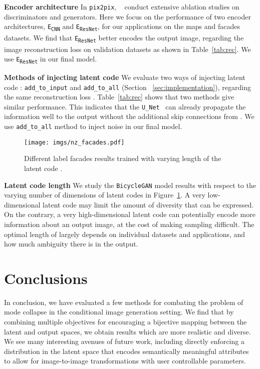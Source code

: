 \documentclass{article}
\newcommand{\pp}{\texttt{pix2pix}\xspace}
\newcommand{\bicycle}{\texttt{BicycleGAN}\xspace} \newcommand{\G}{G\xspace}
\begin{document}
{\bf Encoder architecture} In \pp, ~\citet{isola2016image} conduct extensive ablation studies on discriminators and generators. Here we focus on the performance of two encoder architectures, \texttt{E\textsubscript{CNN}} and \texttt{E\textsubscript{ResNet}}, for our applications on the maps and facades datasets. We find that \texttt{E\textsubscript{ResNet}} better encodes the output image, regarding the image reconstruction loss  on validation datasets as shown in Table~\ref{tab:rec}. We use \texttt{E\textsubscript{ResNet}} in our final model.

{\bf Methods of injecting latent code} We evaluate two ways of injecting latent code : \texttt{add\_to\_input} and \texttt{add\_to\_all} (Section ~\ref{sec:implementation}), regarding the same reconstruction loss . Table~\ref{tab:rec} shows that two methods give similar performance. This indicates that the \texttt{U\_Net}~\cite{ronneberger2015u} can already propagate the information well to the output without the additional skip connections from . We use \texttt{add\_to\_all} method to inject noise in our final model.

\begin{figure}
  \centering
  \texttt{[image: imgs/nz\_facades.pdf]}
\vspace{-4mm}
\caption{Different label  facades results trained with varying length of the latent code . }
\label{fig:numberofz}
\vspace{-6mm}
\end{figure}


{\bf Latent code length} We study the \bicycle model results with respect to the varying number of dimensions of latent codes  in Figure~\ref{fig:numberofz}. A very low-dimensional latent code may limit the amount of diversity that can be expressed. On the contrary, a very high-dimensional latent code can potentially encode more information about an output image, at the cost of making sampling difficult. The optimal length of  largely depends on individual datasets and applications, and how much ambiguity there is in the output. 

\vspace{-2mm} 
\section{Conclusions}
\label{sec:conclusion}
\vspace{-2mm}

In conclusion, we have evaluated a few methods for combating the problem of mode collapse in the conditional image generation setting. We find that by combining multiple objectives for encouraging a bijective mapping between the latent and output spaces, we obtain results which are more realistic and diverse. We see many interesting avenues of future work, including directly enforcing a distribution in the latent space that encodes semantically meaningful attributes to allow for image-to-image transformations with user controllable parameters.
 
\end{document}
